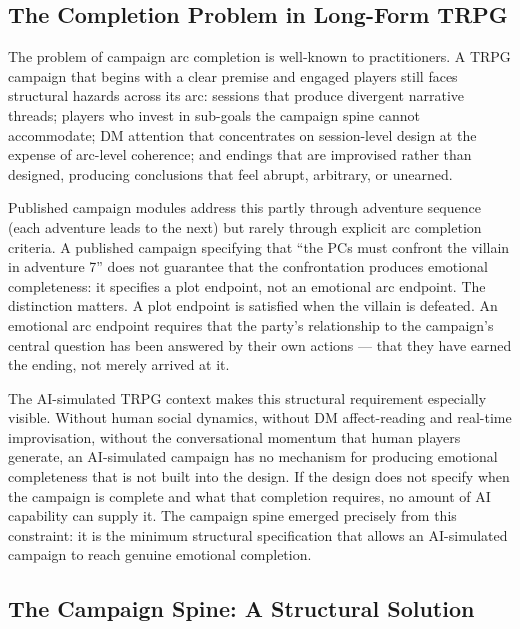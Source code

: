 \subsection{The Completion Problem in Long-Form TRPG}

The problem of campaign arc completion is well-known to practitioners. A TRPG
campaign that begins with a clear premise and engaged players still faces structural
hazards across its arc: sessions that produce divergent narrative threads; players
who invest in sub-goals the campaign spine cannot accommodate; DM attention that
concentrates on session-level design at the expense of arc-level coherence;
and endings that are improvised rather than designed, producing conclusions that
feel abrupt, arbitrary, or unearned.

Published campaign modules address this partly through adventure sequence (each
adventure leads to the next) but rarely through explicit arc completion criteria.
A published campaign specifying that ``the PCs must confront the villain in
adventure 7'' does not guarantee that the confrontation produces emotional
completeness: it specifies a plot endpoint, not an emotional arc endpoint.
The distinction matters. A plot endpoint is satisfied when the villain is
defeated. An emotional arc endpoint requires that the party's relationship
to the campaign's central question has been answered by their own actions ---
that they have earned the ending, not merely arrived at it.

The AI-simulated TRPG context makes this structural requirement especially
visible. Without human social dynamics, without DM affect-reading and
real-time improvisation, without the conversational momentum that human
players generate, an AI-simulated campaign has no mechanism for producing
emotional completeness that is not built into the design. If the design does
not specify when the campaign is complete and what that completion requires,
no amount of AI capability can supply it. The campaign spine emerged precisely
from this constraint: it is the minimum structural specification that allows
an AI-simulated campaign to reach genuine emotional completion.

\subsection{The Campaign Spine: A Structural Solution}

